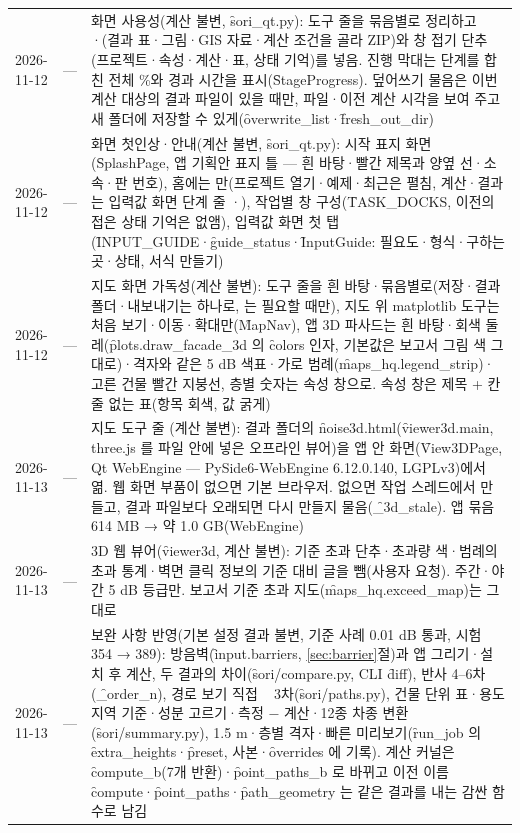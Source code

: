 \documentclass[10.5pt,a4paper]{article}
\begin{document}
\begin{longtable}{P{22mm}P{24mm}P{106mm}}
2026-11-12 & — & 화면 사용성(계산 불변, \f{sori\_qt.py}): 도구 줄을 묶음별로 정리하고 ·(결과 표·그림·GIS 자료·계산 조건을 골라 ZIP)와 창 접기 단추(프로젝트·속성·계산·표, 상태 기억)를 넣음. 진행 막대는 단계를 합친 전체 \%와 경과 시간을 표시(\f{StageProgress}). 덮어쓰기 물음은 이번 계산 대상의 결과 파일이 있을 때만, 파일·이전 계산 시각을 보여 주고 새 폴더에 저장할 수 있게(\f{overwrite\_list}·\f{fresh\_out\_dir}) \\
2026-11-12 & — & 화면 첫인상·안내(계산 불변, \f{sori\_qt.py}): 시작 표지 화면(\f{SplashPage}, 앱 기획안 표지 틀 — 흰 바탕·빨간 제목과 양옆 선·소속·판 번호), 홈에는 만(프로젝트 열기·예제·최근은  펼침, 계산·결과는 입력값 화면 단계 줄 ·), 작업별 창 구성(\f{TASK\_DOCKS}, 이전의 접은 상태 기억은 없앰), 입력값 화면 첫 탭 (\f{INPUT\_GUIDE}·\f{guide\_status}·\f{InputGuide}: 필요도·형식·구하는 곳·상태, 서식 만들기) \\
2026-11-12 & — & 지도 화면 가독성(계산 불변): 도구 줄을 흰 바탕·묶음별로(저장·결과 폴더·내보내기는  하나로, 는 필요할 때만), 지도 위 matplotlib 도구는 처음 보기·이동·확대만(\f{MapNav}), 앱 3D 파사드는 흰 바탕·회색 둘레(\f{plots.draw\_facade\_3d} 의 \f{colors} 인자, 기본값은 보고서 그림 색 그대로)·격자와 같은 5 dB 색표·가로 범례(\f{maps\_hq.legend\_strip})·고른 건물 빨간 지붕선, 층별 숫자는 속성 창으로. 속성 창은 제목 + 칸 줄 없는 표(항목 회색, 값 굵게) \\
2026-11-13 & — & 지도 도구 줄 (계산 불변): 결과 폴더의 \f{noise3d.html}(\f{viewer3d.main}, three.js 를 파일 안에 넣은 오프라인 뷰어)을 앱 안 화면(\f{View3DPage}, Qt WebEngine — PySide6-WebEngine 6.12.0.140, LGPLv3)에서 엶. 웹 화면 부품이 없으면 기본 브라우저. 없으면 작업 스레드에서 만들고, 결과 파일보다 오래되면 다시 만들지 물음(\f{\_3d\_stale}). 앱 묶음 614 MB → 약 1.0 GB(WebEngine) \\
2026-11-13 & — & 3D 웹 뷰어(\f{viewer3d}, 계산 불변): 기준 초과 단추·초과량 색·범례의 초과 통계·벽면 클릭 정보의 기준 대비 글을 뺌(사용자 요청). 주간·야간 5 dB 등급만. 보고서 기준 초과 지도(\f{maps\_hq.exceed\_map})는 그대로 \\
2026-11-13 & — & 보완 사항 반영(기본 설정 결과 불변, 기준 사례 0.01 dB 통과, 시험 354 → 389): 방음벽(\f{input.barriers}, \ref{sec:barrier}절)과 앱 그리기·설치 후 계산, 두 결과의 차이(\f{sori/compare.py}, CLI \f{diff}), 반사 4–6차(\f{\_order\_n}), 경로 보기 직접 ~ 3차(\f{sori/paths.py}), 건물 단위 표·용도지역 기준·성분 고르기·측정 − 계산·12종 차종 변환(\f{sori/summary.py}), 1.5 m·층별 격자·빠른 미리보기(\f{run\_job} 의 \f{extra\_heights}·\f{preset}, 사본·\f{overrides} 에 기록). 계산 커널은 \f{compute\_b}(7개 반환)·\f{point\_paths\_b} 로 바뀌고 이전 이름 \f{compute}·\f{point\_paths}·\f{path\_geometry} 는 같은 결과를 내는 감싼 함수로 남김 \\

\end{longtable}
\end{document}
